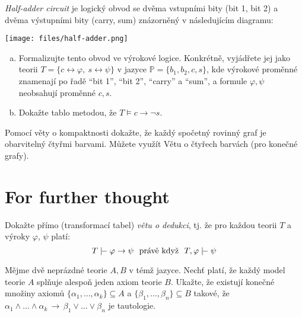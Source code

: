 \begin{problem}

    \emph{Half-adder circuit} je logický obvod se dvěma vstupními bity (bit 1, bit 2) a dvěma výstupními bity (carry, sum) znázorněný v následujícím diagramu:
    \begin{center}
        \texttt{[image: files/half-adder.png]}
    \end{center}
    \begin{enumerate}[(a)]
            \item Formalizujte tento obvod ve výrokové logice. Konkrétně, vyjádřete jej jako teorii $T=\{c\leftrightarrow \varphi,\ s\leftrightarrow \psi\}$ v jazyce $\mathbb P=\{b_1,b_2,c,s\}$, kde výrokové proměnné znamenají po řadě ``bit 1'', ``bit 2'', ``carry'' a ``sum'', a formule $\varphi,\psi$ neobsahují proměnné $c,s$.
            \item Dokažte tablo metodou, že $T\models c\to\neg s$.
    \end{enumerate}

\end{problem}


\begin{problem}

    Pomocí věty o kompaktnosti dokažte, že každý spočetný rovinný graf je obarvitelný čtyřmi barvami. Můžete využít Větu o čtyřech barvách (pro konečné grafy).

\end{problem}

        
\section*{For further thought}
        
        
\begin{problem}

    Dokažte přímo (transformací tabel) \emph{větu o dedukci}, tj. že pro každou teorii $T$ a výroky $\varphi$, $\psi$ platí:
    $$
    T \proves \varphi\to\psi\text{\ \ právě když\ \ }T,\varphi\proves  \psi
    $$

\end{problem}


\begin{problem}
    Mějme dvě neprázdné teorie $A, B$ v témž jazyce. Nechť platí, že každý model teorie $A$ splňuje alespoň jeden axiom teorie $B$. Ukažte, že existují konečné množiny axiomů $\{\alpha_1,\dots,\alpha_k\}\subseteq A$ a $\{\beta_1,\dots,\beta_n\}\subseteq B$ takové, že $\alpha_1\wedge\dots\wedge\alpha_k\,\to\,\beta_1\vee\dots\vee\beta_n$ je tautologie.
\end{problem}
